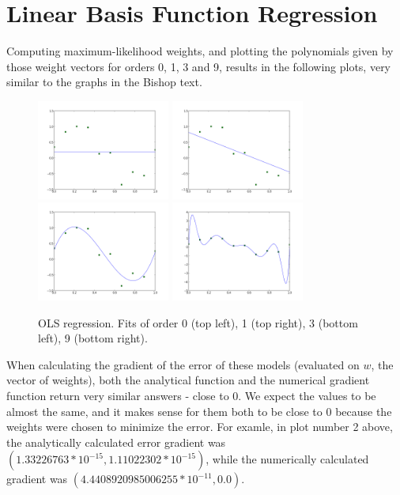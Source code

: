 \documentclass{paper}
\begin{document}
\section{Linear Basis Function Regression}

Computing maximum-likelihood weights, and plotting the polynomials given by those weight vectors for orders 0, 1, 3 and 9, results in the following plots, very similar to the graphs in the Bishop text.

\begin{figure}[H]
	\includegraphics[width=165px]{plot1.png}
	\includegraphics[width=165px]{plot2.png}
	\includegraphics[width=165px]{plot3.png}
	\includegraphics[width=165px]{plot4.png}
	\caption{OLS regression. Fits of order 0 (top left), 1 (top right), 3 (bottom left), 9 (bottom right).}
\end{figure}


When calculating the gradient of the error of these models (evaluated on $w$, the vector of weights), both the analytical function and the numerical gradient function return very similar answers - close to 0. We expect the values to be almost the same, and it makes sense for them both to be close to 0 because the weights were chosen to minimize the error. For examle, in plot number 2 above, the analytically calculated error gradient was $(1.33226763 * 10^{-15}, 1.11022302 * 10^{-15})$, while the numerically calculated gradient was $(4.4408920985006255 * 10^{-11}, 0.0)$.
\end{document}
